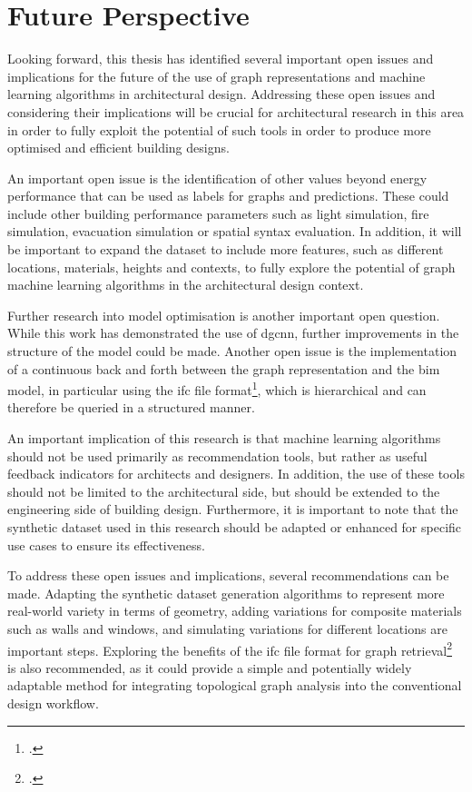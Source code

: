 \documentclass[a4paper, 12pt]{report}
\begin{document}
\section{Future Perspective}\label{sec:future-perspective}

Looking forward, this thesis has identified several important open issues and implications for the future of the use of graph representations and machine learning algorithms in architectural design. Addressing these open issues and considering their implications will be crucial for architectural research in this area in order to fully exploit the potential of such tools in order to produce more optimised and efficient building designs.

An important open issue is the identification of other values beyond energy performance that can be used as labels for graphs and predictions. These could include other building performance parameters such as light simulation, fire simulation, evacuation simulation or spatial syntax evaluation. In addition, it will be important to expand the dataset to include more features, such as different locations, materials, heights and contexts, to fully explore the potential of graph machine learning algorithms in the architectural design context.

Further research into model optimisation is another important open question. While this work has demonstrated the use of \acrlong{dgcnn}, further improvements in the structure of the model could be made. Another open issue is the implementation of a continuous back and forth between the graph representation and the \acrshort{bim} model, in particular using the \acrshort{ifc} file format\footcite{isaac2013analyzing}, which is hierarchical and can therefore be queried in a structured manner.

An important implication of this research is that machine learning algorithms should not be used primarily as recommendation tools, but rather as useful feedback indicators for architects and designers. In addition, the use of these tools should not be limited to the architectural side, but should be extended to the engineering side of building design. Furthermore, it is important to note that the synthetic dataset used in this research should be adapted or enhanced for specific use cases to ensure its effectiveness.

To address these open issues and implications, several recommendations can be made. Adapting the synthetic dataset generation algorithms to represent more real-world variety in terms of geometry, adding variations for composite materials such as walls and windows, and simulating variations for different locations are important steps. Exploring the benefits of the \acrshort{ifc} file format for graph retrieval\footcite{nahar2017applying} is also recommended, as it could provide a simple and potentially widely adaptable method for integrating topological graph analysis into the conventional design workflow.
\end{document}
